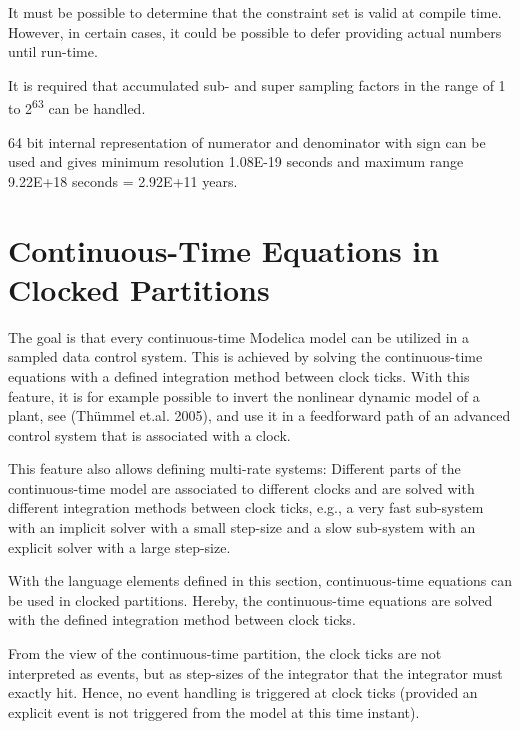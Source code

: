 \begin{nonnormative}
It must be possible to determine that the constraint set is valid at compile time.  However, in certain cases, it could be possible to defer providing actual numbers until run-time.
\end{nonnormative}

It is required that accumulated sub- and super sampling factors in the range of 1 to 2\textsuperscript{63} can be handled.

\begin{nonnormative}
64 bit internal representation of numerator and denominator with sign can be used and gives minimum resolution 1.08E-19 seconds and maximum range 9.22E+18 seconds = 2.92E+11 years.
\end{nonnormative}

\section{Continuous-Time Equations in Clocked Partitions}\label{continuous-time-equations-in-clocked-partitions}

\begin{nonnormative}
The goal is that every continuous-time Modelica model can be utilized in a sampled data control system.  This is achieved by solving the continuous-time equations with a defined
integration method between clock ticks.  With this feature, it is for example possible to invert the nonlinear dynamic model of a plant, see (Thümmel et.al. 2005), and use it in
a feedforward path of an advanced control system that is associated with a clock.

This feature also allows defining multi-rate systems: Different parts of the continuous-time model are associated to different clocks and are solved with different integration
methods between clock ticks, e.g., a very fast sub-system with an implicit solver with a small step-size and a slow sub-system with an explicit solver with a large step-size.
\end{nonnormative}

With the language elements defined in this section, continuous-time
equations can be used in clocked partitions. Hereby, the continuous-time
equations are solved with the defined integration method between clock
ticks.

From the view of the continuous-time partition, the clock ticks are not interpreted as events, but as step-sizes of the integrator that the integrator must exactly hit.
Hence, no event handling is triggered at clock ticks (provided an explicit event is not triggered from the model at this time instant).

